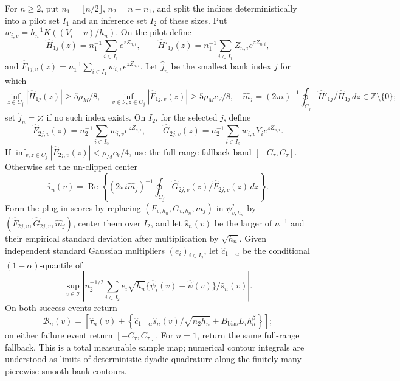 For \(n\ge2\), put \(n_1=\lfloor n/2\rfloor\), \(n_2=n-n_1\), and split the indices deterministically into a pilot set \(I_1\) and an inference set \(I_2\) of these sizes. Put \(w_{i,v}=h_n^{-1}K((V_i-v)/h_n)\). On the pilot define
\[
 \widehat H_{1j}(z)=n_1^{-1}\sum_{i\in I_1}e^{zZ_{n,i}},\qquad
 \widehat H'_{1j}(z)=n_1^{-1}\sum_{i\in I_1}Z_{n,i}e^{zZ_{n,i}},
\]
and \(\widehat F_{1j,v}(z)=n_1^{-1}\sum_{i\in I_1}w_{i,v}e^{zZ_{n,i}}\). Let \(\widehat j_n\) be the smallest bank index \(j\) for which
\[
 \inf_{z\in C_j}|\widehat H_{1j}(z)|\ge5\rho_M/8,
 \quad
 \inf_{v\in\mathcal I,z\in C_j}|\widehat F_{1j,v}(z)|\ge5\rho_Mc_V/8,
 \quad
 \widehat m_j=(2\pi i)^{-1}\oint_{C_j}\widehat H'_{1j}/\widehat H_{1j}\,dz\in\mathbb Z\setminus\{0\};
\]
set \(\widehat j_n=\varnothing\) if no such index exists. On \(I_2\), for the selected \(j\), define
\[
 \widehat F_{2j,v}(z)=n_2^{-1}\sum_{i\in I_2}w_{i,v}e^{zZ_{n,i}},\qquad
 \widehat G_{2j,v}(z)=n_2^{-1}\sum_{i\in I_2}w_{i,v}Y_i e^{zZ_{n,i}}.
\]
If \(\inf_{v,z\in C_j}|\widehat F_{2j,v}(z)|<\rho_Mc_V/4\), use the full-range fallback band \([-C_\tau,C_\tau]\). Otherwise set the un-clipped center
\[
 \widehat\tau_n(v)=\operatorname{Re}\left\{(2\pi i\widehat m_j)^{-1}\oint_{C_j}\widehat G_{2j,v}(z)/\widehat F_{2j,v}(z)\,dz\right\}.
\]
Form the plug-in scores by replacing \((F_{v,h_n},G_{v,h_n},m_j)\) in \(\psi^j_{v,h_n}\) by \((\widehat F_{2j,v},\widehat G_{2j,v},\widehat m_j)\), center them over \(I_2\), and let \(\widehat s_n(v)\) be the larger of \(n^{-1}\) and their empirical standard deviation after multiplication by \(\sqrt{h_n}\). Given independent standard Gaussian multipliers \((e_i)_{i\in I_2}\), let \(\widehat c_{1-\alpha}\) be the conditional \((1-\alpha)\)-quantile of
\[
 \sup_{v\in\mathcal I}\left|n_2^{-1/2}\sum_{i\in I_2}e_i\sqrt{h_n}\{\widehat\psi_{i}(v)-\overline{\widehat\psi}(v)\}/\widehat s_n(v)\right|.
\]
On both success events return
\[
 \mathcal B_n(v)=\left[\widehat\tau_n(v)\pm\left\{\widehat c_{1-\alpha}\widehat s_n(v)/\sqrt{n_2h_n}+B_{\mathrm{bias}}L_\tau h_n^\beta\right\}\right];
\]
on either failure event return \([-C_\tau,C_\tau]\). For \(n=1\), return the same full-range fallback. This is a total measurable sample map; numerical contour integrals are understood as limits of deterministic dyadic quadrature along the finitely many piecewise smooth bank contours.